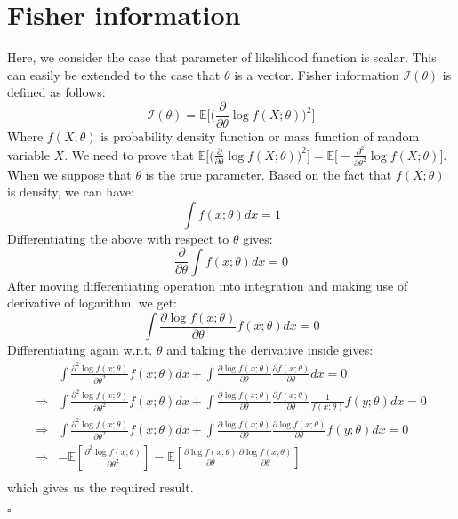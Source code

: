 \section{Fisher information} \label{appendix:fisher_matrix}
Here, we consider the case that parameter of likelihood function is scalar. This can easily be extended to the case that $\theta$ is a vector. Fisher information $\mathcal{I}(\theta)$ is defined as follows:
\begin{equation}
	\mathcal{I}(\theta) = \mathbb{E}\big[\big(\frac{\partial}{\partial \theta}\log{f(X; \theta)}\big)^2\big]
\end{equation}
Where $f(X;\theta)$ is probability density function or mass function of random variable $X$. We need to prove that $\mathbb{E}\big[\big(\frac{\partial}{\partial \theta}\log{f(X; \theta)}\big)^2\big] = \mathbb{E}\big[-\frac{\partial^2}{\partial \theta^2}\log{f(X; \theta)}\big]$.
When we suppose that $\theta$ is the true parameter. Based on the fact that $f(X;\theta)$ is density, we can have:
\[
\int f(x;\theta) dx = 1
\]
Differentiating the above with respect to $\theta$ gives:
\[
\frac{\partial}{\partial \theta}\int f(x;\theta) dx = 0
\]
After moving differentiating operation into integration and making use of derivative of logarithm, we get:
\[
\int \frac{\partial \log f(x;\theta)}{\partial \theta} f(x;\theta) dx = 0
\]
Differentiating again w.r.t. $\theta$ and taking the derivative inside gives:
\[
\begin{aligned}
&\int \frac{\partial^2\log f(x;\theta)}{\partial \theta^2}f(x;\theta) dx + \int \frac{\partial\log f(x;\theta)}{\partial \theta} \frac{\partial f(x;\theta)}{\partial \theta}dx
= 0\\
\Rightarrow &\int \frac{\partial^2\log f(x;\theta)}{\partial \theta^2}f(x;\theta) dx + \int \frac{\partial\log f(x;\theta)}{\partial \theta} \frac{\partial f(x;\theta)}{\partial \theta}\frac{1}{f(x;\theta)} f(y;\theta) dx= 0 \\
\Rightarrow &\int \frac{\partial^2\log f(x;\theta)}{\partial \theta^2}f(x;\theta) dx + \int \frac{\partial\log f(x;\theta)}{\partial \theta} \frac{\partial \log f(x;\theta)}{\partial \theta} f(y;\theta) dx= 0 \\
\Rightarrow & -\mathbb{E}[\frac{\partial^2\log f(x;\theta)}{\partial \theta^2}] = \mathbb{E}[\frac{\partial\log f(x;\theta)}{\partial \theta} \frac{\partial \log f(x;\theta)}{\partial \theta} ] \\
\end{aligned}
\]
which gives us the required result.
 \begin{flushright}
 	$\square$
 \end{flushright}
 

